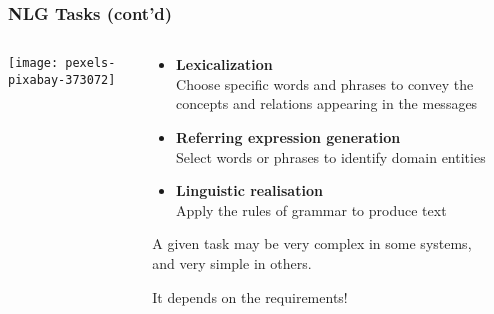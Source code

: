 \begin{frame}
\frametitle{NLG Tasks (cont'd)}

\begin{columns}

	\begin{column}{0.4\textwidth}
		\centering
		\texttt{[image: pexels-pixabay-373072]}
	\end{column}
	
	\begin{column}{0.6\textwidth}
	
		\begin{itemize}
		
			\item \textbf{Lexicalization} \\
			      Choose specific words and phrases
			      to convey the concepts and relations
			      appearing in the messages
			      
			\item \textbf{Referring expression generation} \\
			      Select words or phrases to identify domain entities
			
			\item \textbf{Linguistic realisation} \\
			      Apply the rules of grammar to produce text
		
		\end{itemize}
		
		\vspace{12pt}
		
		A given task may be very complex in some systems,\\
		and very simple in others.
		
		\vspace{12pt}
		
		It depends on the requirements!
	
	\end{column}

\end{columns}

\end{frame}
